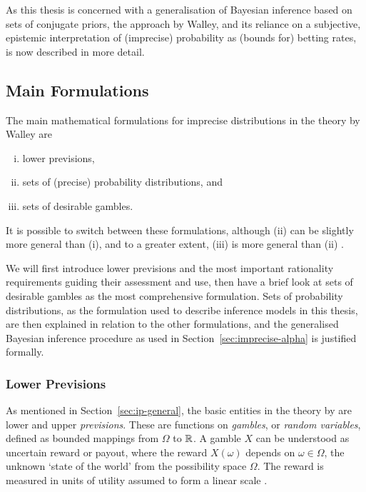 As this thesis is concerned with a generalisation of Bayesian inference
based on sets of conjugate priors, the approach by Walley,
and its reliance on a subjective, epistemic interpretation of (imprecise) probability
as (bounds for) betting rates, is now described in more detail.


\subsection{Main Formulations}
\label{sec:ip-main}


The main mathematical formulations for imprecise distributions
in the theory by Walley \parencite*{1991:walley, 2000:walley::towards}
are
\begin{enumerate}[(i)]
\item lower previsions,
\item sets of (precise) probability distributions, and
\item sets of desirable gambles.
\end{enumerate}
It is possible to switch between these formulations,
although (ii) can be slightly more general than (i),
and to a greater extent, (iii) is more general than (ii) \parencite{2000:walley::towards}.

\medskip

We will first introduce lower previsions
and the most important rationality requirements guiding their assessment and use,
then have a brief look at sets of desirable gambles as the most comprehensive formulation.
Sets of probability distributions, as the formulation used to describe inference models in this thesis,
are then explained in relation to the other formulations,
and the generalised Bayesian inference procedure as used in Section~\ref{sec:imprecise-alpha} is justified formally.

\subsubsection{Lower Previsions}
\label{sec:lowerprevisions}

As mentioned in Section~\ref{sec:ip-general}, the basic entities in the theory by \textcite{1991:walley}
are lower and upper \emph{previsions}.
These are functions on \emph{gambles}, or \emph{random variables},
defined as bounded mappings from $\Omega$ to $\mathbb{R}$.
A gamble $X$ can be understood as uncertain reward or payout,
where the reward $X(\omega)$ depends on $\omega \in \Omega$,
the unknown `state of the world' from the possibility space $\Omega$.
The reward is measured in units of utility assumed to form a linear scale
\parencite[\S 2.2]{1991:walley}.

